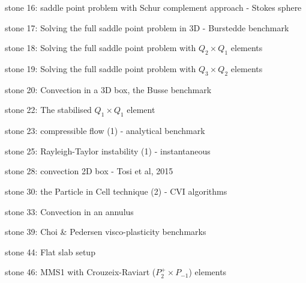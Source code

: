{\noindent stone 16: saddle point problem with Schur complement approach - Stokes sphere 


\noindent stone 17: Solving the full saddle point problem in 3D - Burstedde benchmark \cite{dobo04} 


\noindent stone 18: Solving the full saddle point problem with $Q_2\times Q_1$ elements 


\noindent stone 19: Solving the full saddle point problem with $Q_3\times Q_2$ elements 


\noindent stone 20: Convection in a 3D box, the Busse benchmark \cite{bucc93}


\noindent stone 22: The stabilised $Q_1 \times Q_1$ element 


\noindent stone 23: compressible flow (1) - analytical benchmark 



\noindent stone 25: Rayleigh-Taylor instability (1) - instantaneous \cite{vaks97}


\noindent stone 28: convection 2D box - Tosi et al, 2015


\noindent stone 30: the Particle in Cell technique (2) - CVI algorithms


\noindent stone 33: Convection in an annulus 


\noindent stone 39: Choi \& Pedersen visco-plasticity benchmarks 



\noindent stone 44: Flat slab setup 


\noindent stone 46: MMS1 with Crouzeix-Raviart ($P_2^+\times P_{-1}$) elements  


}
